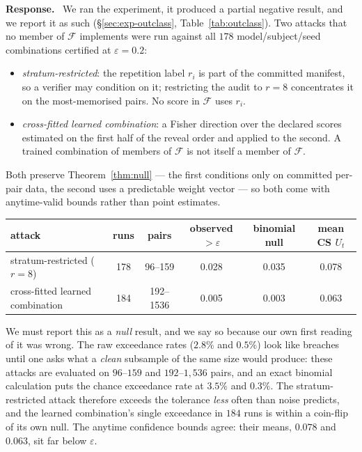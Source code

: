 \documentclass[11pt,a4paper]{article}
\newcommand{\eps}{\varepsilon}
\newcommand{\F}{\mathcal{F}}
\newenvironment{reply}{%
  \par\smallskip\noindent\textbf{\color{acol}Response.}\ \begingroup}{\endgroup\par}
\begin{document}
\begin{reply}
We ran the experiment, it produced a partial negative result, and we report it as such
(\S\ref{sec:exp-outclass}, Table~\ref{tab:outclass}). Two attacks that no member of $\F$ implements were run against all
$178$ model/subject/seed combinations certified at $\eps=0.2$:
\begin{itemize}[leftmargin=1.4em,itemsep=0pt,topsep=2pt]
\item \emph{stratum-restricted}: the repetition label $r_i$ is part of the committed
manifest, so a verifier may condition on it; restricting the audit to $r=8$
concentrates it on the most-memorised pairs. No score in $\F$ uses $r_i$.
\item \emph{cross-fitted learned combination}: a Fisher direction over the declared
scores estimated on the first half of the reveal order and applied to the second. A
trained combination of members of $\F$ is not itself a member of $\F$.
\end{itemize}
Both preserve Theorem~\ref{thm:null} --- the first conditions only on committed per-pair data, the
second uses a predictable weight vector --- so both come with anytime-valid bounds rather
than point estimates.

\begin{center}\small
\begin{tabular}{lccccc}
\toprule
attack & runs & pairs & observed $>\eps$ & binomial null & mean CS $U_t$\\
\midrule
stratum-restricted ($r=8$) & 178 & 96--159 & 0.028 & 0.035 & 0.078\\
cross-fitted learned combination & 184 & 192--1536 & 0.005 & 0.003 & 0.063\\
\bottomrule
\end{tabular}
\end{center}

We must report this as a \emph{null} result, and we say so because our own first
reading of it was wrong. The raw exceedance rates ($2.8\%$ and $0.5\%$) look like
breaches until one asks what a \emph{clean} subsample of the same size would produce:
these attacks are evaluated on $96$--$159$ and $192$--$1{,}536$ pairs, and an exact
binomial calculation puts the chance exceedance rate at $3.5\%$ and $0.3\%$. The
stratum-restricted attack therefore exceeds the tolerance \emph{less} often than noise
predicts, and the learned combination's single exceedance in $184$ runs is within a
coin-flip of its own null. The anytime confidence bounds agree: their means, $0.078$
and $0.063$, sit far below $\eps$.


\end{reply}
\end{document}
